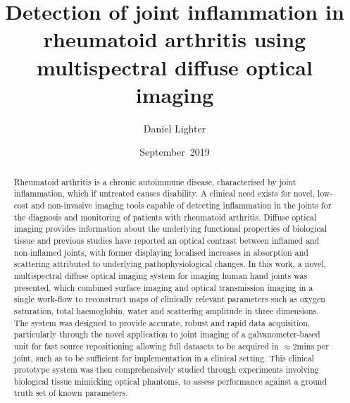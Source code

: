 \documentclass[twoside]{bhamthesis}
\title{Detection of joint inflammation in rheumatoid arthritis using multispectral diffuse optical imaging}
\author{Daniel Lighter}
\date{September~2019}  %
\makeatletter
\theoremstyle{definition}
\newcommand{\makecrestcover}{%
\begin{titlepage}
\centering\singlespacing
\vspace*{1cm}
{\huge\bfseries University of Birmingham\par}
\vspace*{2cm}
\texttt{[image: crest]}\par
\vspace*{\stretch{1}}
{\Huge\bfseries
\@author\par
\vspace{1cm}
\@title\par}
\vspace*{\stretch{1}}
{\Large\@date\par}
\end{titlepage}
}
\makeatother
\begin{document}
\frontmatter

\maketitle

\begin{abstract}
Rheumatoid arthritis is a chronic autoimmune disease, characterised by joint inflammation, which if untreated causes disability. A clinical need exists for novel, low-cost and non-invasive imaging tools capable of detecting inflammation in the joints for the diagnosis and monitoring of patients with rheumatoid arthritis. Diffuse optical imaging provides information about the underlying functional properties of biological tissue and previous studies have reported an optical contrast between inflamed and non-inflamed joints, with former displaying localised increases in absorption and scattering attributed to underlying pathophysiological changes. In this work, a novel, multispectral diffuse optical imaging system for imaging human hand joints was presented, which combined surface imaging and optical transmission imaging in a single work-flow to reconstruct maps of clinically relevant parameters such as oxygen saturation, total haemoglobin, water and scattering amplitude in three dimensions. The system was designed to provide accurate, robust and rapid data acquisition, particularly through the novel application to joint imaging of a galvanometer-based unit for fast source repositioning allowing full datasets to be acquired in $\approx$2mins per joint, such as to be sufficient for implementation in a clinical setting. This clinical prototype system was then comprehensively studied through experiments involving biological tissue mimicking optical phantoms, to assess performance against a ground truth set of known parameters. 


\end{abstract}
\end{document}
